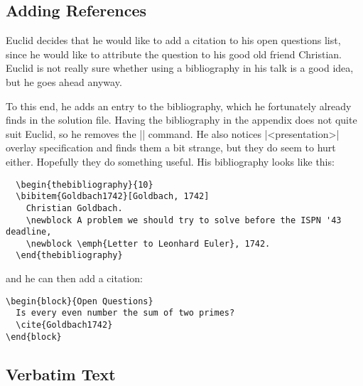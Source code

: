 \subsection{Adding References}

Euclid decides that he would like to add a citation to his open
questions list, since he would like to attribute the question to his
good old friend Christian. Euclid is not really sure whether using a
bibliography in his talk is a good idea, but he goes ahead anyway. 

To this end, he adds an entry to the bibliography, which he
fortunately already finds in the solution file. Having the
bibliography in the appendix does not quite suit Euclid, so he removes
the |\appendix| command. He also notices |<presentation>| overlay
specification and finds them a bit strange, but they do seem to hurt
either. Hopefully they do something useful. His bibliography looks
like this:
\begin{verbatim}
  \begin{thebibliography}{10}
  \bibitem{Goldbach1742}[Goldbach, 1742]
    Christian Goldbach.
    \newblock A problem we should try to solve before the ISPN '43 deadline, 
    \newblock \emph{Letter to Leonhard Euler}, 1742.
  \end{thebibliography}
\end{verbatim}
and he can then add a citation:
\begin{verbatim}
\begin{block}{Open Questions}
  Is every even number the sum of two primes?
  \cite{Goldbach1742}
\end{block}
\end{verbatim}





\subsection{Verbatim Text}

